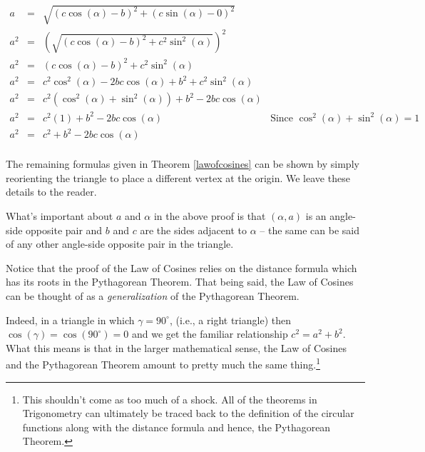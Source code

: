 \documentclass{ximera}
\begin{document}
\[\begin{array}{rclr}
a & = & \sqrt{(c \cos(\alpha) - b)^{2} + (c \sin(\alpha) - 0)^2} & \\  
a^{2} & = & \left(\sqrt{(c \cos(\alpha) - b)^{2} + c^2 \sin^2(\alpha)}\right)^2 & \\   
a^2 & = &  (c \cos(\alpha) - b)^{2} + c^2 \sin^2(\alpha) & \\   
a^2 & = & c^2 \cos^2(\alpha) - 2bc \cos(\alpha) + b^2 + c^2 \sin^2(\alpha) & \\   
a^2 & = & c^2\left(\cos^2(\alpha) + \sin^2(\alpha)\right) + b^2 - 2bc \cos(\alpha) & \\   
a^2 & = & c^2(1) + b^2 - 2bc \cos(\alpha) & \text{Since $\cos^2(\alpha) + \sin^2(\alpha) = 1$}\\   
a^2 & = & c^2 + b^2 - 2bc \cos(\alpha) & \\
\end{array} \]

The remaining formulas given in Theorem \ref{lawofcosines} can be shown by simply reorienting the triangle to place a different vertex at the origin.  We leave these details to the reader.  

 

What's important about $a$ and $\alpha$ in the above proof is that $(\alpha,a)$ is an angle-side opposite pair and $b$ and $c$ are the sides adjacent to $\alpha$ -- the same can be said of any other angle-side opposite pair in the triangle.   

 

Notice that the proof of the Law of Cosines relies on the distance formula which has its roots in the Pythagorean Theorem.  That being said, the Law of Cosines can be thought of as a \textit{generalization} of the Pythagorean Theorem. 

 

Indeed, in a triangle in which $\gamma = 90^{\circ}$, (i.e., a right triangle) then $\cos(\gamma) = \cos\left(90^{\circ}\right) = 0$  and we get the familiar relationship  $c^2 = a^2 + b^2$.  What this means is that in the larger mathematical sense, the Law of Cosines and the Pythagorean Theorem amount to pretty much the same thing.\footnote{This shouldn't come as too much of a shock.  All of the theorems in Trigonometry can ultimately be traced back to the definition of the circular functions along with the distance formula and hence, the Pythagorean Theorem.}
\end{document}
